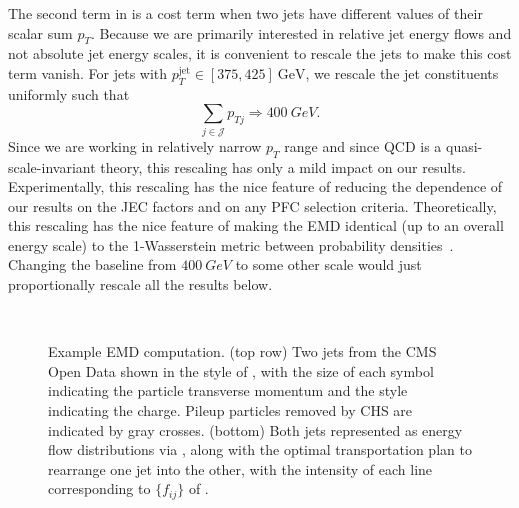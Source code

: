 \documentclass[aps,prd,twocolumn,preprintnumbers,nofootinbib,longbibliography,floatfix,superscriptaddress]{revtex4-1}
\begin{document}
The second term in  is a cost term when two jets have different values of their scalar sum $p_T$.
%
Because we are primarily interested in relative jet energy flows and not absolute jet energy scales, it is convenient to rescale the jets to make this cost term vanish.
%
For jets with $p_T^\text{jet} \in [375,425]~\text{GeV}$, we rescale the jet constituents uniformly such that
%
\begin{equation}
\label{eq:EMDrescaling}
\sum_{j \in \mathcal{J}} p_{Tj} \Rightarrow \SI{400}{GeV}.
\end{equation}
%
Since we are working in relatively narrow $p_T$ range and since QCD is a quasi-scale-invariant theory, this rescaling has only a mild impact on our results.
%
Experimentally, this rescaling has the nice feature of reducing the dependence of our results on the JEC factors and on any PFC selection criteria.
%
Theoretically, this rescaling has the nice feature of making the EMD identical (up to an overall energy scale) to the 1-Wasserstein metric between probability densities~\cite{wasserstein1969markov,dobrushin1970prescribing}.
%
Changing the baseline from $\SI{400}{GeV}$ to some other scale would just proportionally rescale all the results below.


\begin{figure*}
	\\
  \caption{
   Example EMD computation.
(top row) Two jets from the CMS Open Data shown in the style of , with the size of each symbol indicating the particle transverse momentum and the style indicating the charge.
%
Pileup particles removed by CHS are indicated by gray crosses.
%
(bottom) Both jets represented as energy flow distributions via , along with the optimal transportation plan to rearrange one jet into the other, with the intensity of each line corresponding to $\{f_{ij}\}$ of .
    \label{fig:EMDexample}
}
\end{figure*}
\end{document}
